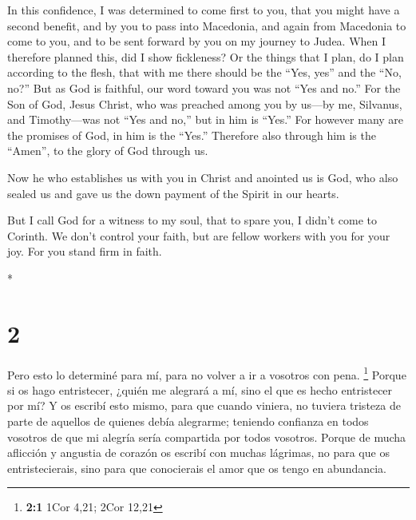 \begin{paracol}{2}
\begin{otherlanguage}{english}
 In this confidence, I was determined to come first to
you, that you might have a second benefit,  and by you to
pass into Macedonia, and again from Macedonia to come to you, and to be
sent forward by you on my journey to Judea.  When I
therefore planned this, did I show fickleness? Or the things that I
plan, do I plan according to the flesh, that with me there should be the
``Yes, yes'' and the ``No, no?''  But as God is faithful,
our word toward you was not ``Yes and no.''  For the Son
of God, Jesus Christ, who was preached among you by us---by me,
Silvanus, and Timothy---was not ``Yes and no,'' but in him is ``Yes.''
 For however many are the promises of God, in him is the
``Yes.'' Therefore also through him is the ``Amen'', to the glory of God
through us.

 Now he who establishes us with you in Christ and
anointed us is God,  who also sealed us and gave us the
down payment of the Spirit in our hearts.

 But I call God for a witness to my soul, that to spare
you, I didn't come to Corinth.  We don't control your
faith, but are fellow workers with you for your joy. For you stand firm
in faith.

\end{otherlanguage}

\switchcolumn[0]*

\hypertarget{section-2}{%
\section{2}\label{section-2}}

 Pero esto lo determiné para mí, para no volver a ir a
vosotros con pena. \footnote{\textbf{2:1} 1Cor 4,21; 2Cor 12,21}
 Porque si os hago entristecer, ¿quién me alegrará a mí,
sino el que es hecho entristecer por mí?  Y os escribí
esto mismo, para que cuando viniera, no tuviera tristeza de parte de
aquellos de quienes debía alegrarme; teniendo confianza en todos
vosotros de que mi alegría sería compartida por todos vosotros.
 Porque de mucha aflicción y angustia de corazón os
escribí con muchas lágrimas, no para que os entristecierais, sino para
que conocierais el amor que os tengo en abundancia.

\hypertarget{eliminaciuxf3n-de-la-brecha-entre-pablo-y-los-corintios-recomendaciuxf3n-de-indulgencia-contra-el-malhechor-arrepentido}{%
}
\end{paracol}
